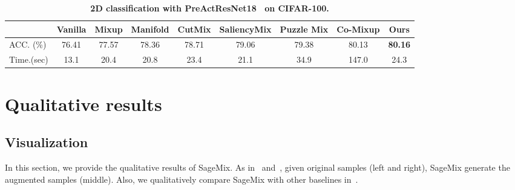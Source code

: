 \documentclass{article}
\begin{document}
\begin{table}[h!]
  \centering 
  \setlength{\tabcolsep}{2pt}
  \caption{\textbf{2D classification with PreActResNet18~\cite{he2016identity} on CIFAR-100.}}
  \label{table:2dcls_supple} 
  \begin{tabular}{l|ccccccc|c}
  \toprule
  \multicolumn{1}{c|}{}&\multicolumn{1}{c}{\textbf{Vanilla}}& \multicolumn{1}{c}{\textbf{Mixup}} &\multicolumn{1}{c}{\textbf{Manifold}} &
  \multicolumn{1}{c}{\textbf{CutMix}} &
  \multicolumn{1}{c}{\textbf{SaliencyMix}}&
  \multicolumn{1}{c}{\textbf{Puzzle Mix}} & \multicolumn{1}{c|}{\textbf{Co-Mixup}} &  \multicolumn{1}{c}{\textbf{Ours}} \\
  \midrule
  \midrule
  ACC. (\%) & 76.41 & 77.57 & 78.36 & 78.71 & 79.06 & 79.38 & 80.13 & \textbf{80.16}\\
  Time.(sec) & 13.1 & 20.4 & 20.8 & 23.4 & 21.1 & 34.9 & 147.0 & 24.3 \\

  \bottomrule
  \end{tabular}
  
\end{table} 
  \section{Qualitative results}
\label{sec:Qualitative}
\subsection{Visualization}
In this section, we provide the qualitative results of SageMix. As in~ and~, given original samples (left and right), SageMix generate the augmented samples (middle). Also, we qualitatively compare SageMix with other baselines in~.
\end{document}
